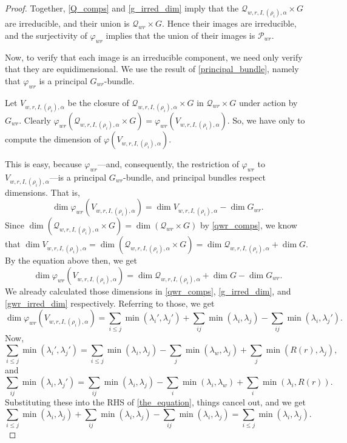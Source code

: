 \documentclass[12pt,psamsfonts]{article}
\begin{document}
\begin{proof}
    Together, \cref{Q_comps} and \cref{g_irred_dim} imply that the \(\mathcal{Q}_{w,r,I,(\rho_i),\alpha} \times G\) are irreducible, and their union is \(\mathcal{Q}_{wr} \times G\).
    Hence their images are irreducible, and the surjectivity of \(\varphi_{wr}\) implies that the union of their images is \(\mathcal{P}_{wr}\).
    \par Now, to verify that each image is an irreducible component, we need only verify that they are equidimensional.
    We use the result of \cref{principal_bundle}, namely that \(\varphi_{wr}\) is a principal \(G_{wr}\)-bundle.
    \par Let \(V_{w,r,I,(\rho_i),\alpha}\) be the closure of \(\mathcal{Q}_{w,r,I,(\rho_i),\alpha} \times G\) in \(\mathcal{Q}_{wr} \times G\) under action by \(G_{wr}\).
    Clearly \(\varphi_{wr}(\mathcal{Q}_{w,r,I,(\rho_i),\alpha} \times G) = \varphi_{wr}(V_{w,r,I,(\rho_i),\alpha})\).
    So, we have only to compute the dimension of \(\varphi(V_{w,r,I,(\rho_i),\alpha})\).
    \par This is easy, because \(\varphi_{wr}\)---and, consequently, the restriction of \(\varphi_{wr}\) to \(V_{w,r,I,(\rho_i),\alpha}\)---is a principal \(G_{wr}\)-bundle, and principal bundles respect dimensions.
    That is,
    \[\dim \varphi_{wr}(V_{w,r,I,(\rho_i),\alpha}) = \dim V_{w,r,I,(\rho_i),\alpha} - \dim G_{wr}.\]
    Since \(\dim (\mathcal{Q}_{w,r,I,(\rho_i),\alpha} \times G) = \dim (\mathcal{Q}_{wr} \times G)\) by \cref{qwr_comps}, we know that \(\dim V_{w,r,I,(\rho_i),\alpha} = \dim (\mathcal{Q}_{w,r,I,(\rho_i),\alpha} \times G) = \dim \mathcal{Q}_{w,r,I,(\rho_i),\alpha} + \dim G\).
    By the equation above then, we get 
    \[\dim \varphi_{wr}(V_{w,r,I,(\rho_i),\alpha}) = \dim \mathcal{Q}_{w,r,I,(\rho_i),\alpha} + \dim G - \dim G_{wr}.\]
    We already calculated those dimensions in \cref{qwr_comps}, \cref{g_irred_dim}, and \cref{gwr_irred_dim} respectively.
    Referring to those, we get 
    \begin{equation}\label{the_equation}
        \dim \varphi_{wr}(V_{w,r,I,(\rho_i),\alpha}) = \sum_{i \leq j} \min(\lambda_i', \lambda_j') + \sum_{ij} \min(\lambda_i, \lambda_j) - \sum_{ij} \min(\lambda_i, \lambda_j').
    \end{equation}
    Now,
    \[\sum_{i \leq j} \min(\lambda_i', \lambda_j') = \sum_{i \leq j} \min(\lambda_i, \lambda_j) - \sum_j \min(\lambda_w, \lambda_j) + \sum_j \min(R(r), \lambda_j),\]
    and
    \[\sum_{ij} \min(\lambda_i, \lambda_j') = \sum_{ij} \min(\lambda_i, \lambda_j) - \sum_i \min(\lambda_i, \lambda_w) + \sum_i \min(\lambda_i, R(r)).\]
    Substituting these into the RHS of \cref{the_equation}, things cancel out, and we get
    \[\sum_{i \leq j} \min(\lambda_i, \lambda_j) + \sum_{ij} \min(\lambda_i, \lambda_j) - \sum_{ij} \min(\lambda_i, \lambda_j) = \sum_{i \leq j} \min(\lambda_i, \lambda_j).\]
\end{proof}
\end{document}
